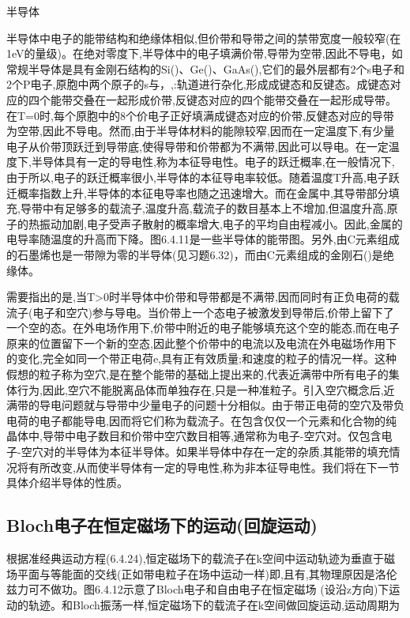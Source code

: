 半导体

半导体中电子的能带结构和绝缘体相似,但价带和导带之间的禁带宽度一般较窄(在1eV的量级)。在绝对零度下,半导体中的电子填满价带,导带为空带,因此不导电，如常规半导体是具有金刚石结构的Si()、Ge()、GaAs(),它们的最外层都有2个s电子和2个P电子,原胞中两个原子的s与，,:轨道进行杂化,形成成键态和反键态。成键态对应的四个能带交叠在一起形成价带,反键态对应的四个能带交叠在一起形成导带。在T=0时,每个原胞中的8个价电子正好填满成键态对应的价带,反健态对应的导带为空带,因此不导电。然而,由于半导体材料的能隙较窄,因而在一定温度下,有少量电子从价带顶跃迁到导带底,使得导带和价带都为不满带,因此可以导电。在一定温度下,半导体具有一定的导电性,称为本征导电性。电子的跃迁概率,在一般情况下,由于所以,电子的跃迁概率很小,半导体的本征导电率较低。随着温度T升高,电子跃迁概率指数上升,半导体的本征电导率也随之迅速增大。而在金属中,其导带部分填充,导带中有足够多的载流子,温度升高,载流子的数目基本上不增加,但温度升高,原子的热振动加剧,电子受声子散射的概率增大,电子的平均自由程减小。因此,金属的电导率随温度的升高而下降。图6.4.11是一些半导体的能带图。另外,由C元素组成的石墨烯也是一带隙为零的半导体(见习题6.32)，而由C元素组成的金刚石()是绝缘体。

需要指出的是,当T>0时半导体中价带和导带都是不满带,因而同时有正负电荷的载流子(电子和空穴)参与导电。当价带上一个态电子被激发到导带后,价带上留下了一个空的态。在外电场作用下,价带中附近的电子能够填充这个空的能态,而在电子原来的位置留下一个新的空态,因此整个价带中的电流以及电流在外电磁场作用下的变化,完全如同一个带正电荷e,具有正有效质量;和速度的粒子的情况一样。这种假想的粒子称为空穴,是在整个能带的基础上提出来的,代表近满带中所有电子的集体行为,因此,空穴不能脱离品体而单独存在,只是一种准粒子。引入空穴概念后,近满带的导电问题就与导带中少量电子的问题十分相似。由于带正电荷的空穴及带负电荷的电子都能导电,因而将它们称为载流子。在包含仅仅一个元素和化合物的纯晶体中,导带中电子数目和价带中空穴数目相等,通常称为电子-空穴对。仅包含电子-空穴对的半导体为本征半导体。如果半导体中存在一定的杂质,其能带的填充情况将有所改变,从而使半导体有一定的导电性,称为非本征导电性。我们将在下一节具体介绍半导体的性质。



\subsection{Bloch电子在恒定磁场下的运动(回旋运动)}

根据准经典运动方程(6.4.24),恒定磁场下的载流子在k空间中运动轨迹为垂直于磁场平面与等能面的交线(正如带电粒子在场中运动一样)即,且有,其物理原因是洛伦兹力可不做功。图6.4.12示意了Bloch电子和自由电子在恒定磁场 (设沿z方向)下运动的轨迹。和Bloch振荡一样,恒定磁场下的载流子在k空间做回旋运动,运动周期为

